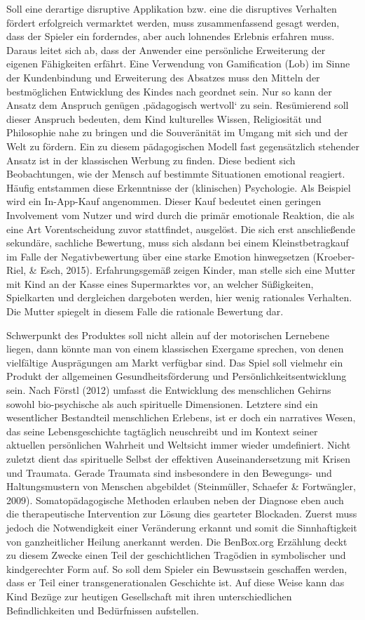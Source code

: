 \documentclass[
  a4paper,
  DIV=11,
  numbers=noendperiod,
  onecolumn,
  oneside,
  a4paper]{scrartcl}
\begin{document}
Soll eine derartige disruptive Applikation bzw. eine die disruptives
Verhalten fördert erfolgreich vermarktet werden, muss zusammenfassend
gesagt werden, dass der Spieler ein forderndes, aber auch lohnendes
Erlebnis erfahren muss. Daraus leitet sich ab, dass der Anwender eine
persönliche Erweiterung der eigenen Fähigkeiten erfährt. Eine Verwendung
von Gamification (Lob) im Sinne der Kundenbindung und Erweiterung des
Absatzes muss den Mitteln der bestmöglichen Entwicklung des Kindes nach
geordnet sein. Nur so kann der Ansatz dem Anspruch genügen ‚pädagogisch
wertvoll` zu sein. Resümierend soll dieser Anspruch bedeuten, dem Kind
kulturelles Wissen, Religiosität und Philosophie nahe zu bringen und die
Souveränität im Umgang mit sich und der Welt zu fördern. Ein zu diesem
pädagogischen Modell fast gegensätzlich stehender Ansatz ist in der
klassischen Werbung zu finden. Diese bedient sich Beobachtungen, wie der
Mensch auf bestimmte Situationen emotional reagiert. Häufig entstammen
diese Erkenntnisse der (klinischen) Psychologie. Als Beispiel wird ein
In-App-Kauf angenommen. Dieser Kauf bedeutet einen geringen Involvement
vom Nutzer und wird durch die primär emotionale Reaktion, die als eine
Art Vorentscheidung zuvor stattfindet, ausgelöst. Die sich erst
anschließende sekundäre, sachliche Bewertung, muss sich alsdann bei
einem Kleinstbetragkauf im Falle der Negativbewertung über eine starke
Emotion hinwegsetzen (Kroeber-Riel, \& Esch, 2015). Erfahrungsgemäß
zeigen Kinder, man stelle sich eine Mutter mit Kind an der Kasse eines
Supermarktes vor, an welcher Süßigkeiten, Spielkarten und dergleichen
dargeboten werden, hier wenig rationales Verhalten. Die Mutter spiegelt
in diesem Falle die rationale Bewertung dar.

Schwerpunkt des Produktes soll nicht allein auf der motorischen
Lernebene liegen, dann könnte man von einem klassischen Exergame
sprechen, von denen vielfältige Ausprägungen am Markt verfügbar sind.
Das Spiel soll vielmehr ein Produkt der allgemeinen Gesundheitsförderung
und Persönlichkeitsentwicklung sein. Nach Förstl (2012) umfasst die
Entwicklung des menschlichen Gehirns sowohl bio-psychische als auch
spirituelle Dimensionen. Letztere sind ein wesentlicher Bestandteil
menschlichen Erlebens, ist er doch ein narratives Wesen, das seine
Lebensgeschichte tagtäglich neuschreibt und im Kontext seiner aktuellen
persönlichen Wahrheit und Weltsicht immer wieder umdefiniert. Nicht
zuletzt dient das spirituelle Selbst der effektiven Auseinandersetzung
mit Krisen und Traumata. Gerade Traumata sind insbesondere in den
Bewegungs- und Haltungsmustern von Menschen abgebildet (Steinmüller,
Schaefer \& Fortwängler, 2009). Somatopädagogische Methoden erlauben
neben der Diagnose eben auch die therapeutische Intervention zur Lösung
dies gearteter Blockaden. Zuerst muss jedoch die Notwendigkeit einer
Veränderung erkannt und somit die Sinnhaftigkeit von ganzheitlicher
Heilung anerkannt werden. Die BenBox.org Erzählung deckt zu diesem
Zwecke einen Teil der geschichtlichen Tragödien in symbolischer und
kindgerechter Form auf. So soll dem Spieler ein Bewusstsein geschaffen
werden, dass er Teil einer transgenerationalen Geschichte ist. Auf diese
Weise kann das Kind Bezüge zur heutigen Gesellschaft mit ihren
unterschiedlichen Befindlichkeiten und Bedürfnissen aufstellen.
\end{document}
